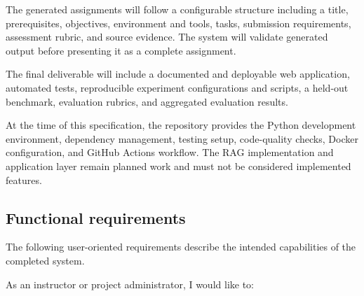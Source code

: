 \documentclass[12pt,a4paper]{article}
\begin{document}
The generated assignments will follow a configurable structure
including a title, prerequisites, objectives, environment and
tools, tasks, submission requirements, assessment rubric, and
source evidence. The system will validate generated output before
presenting it as a complete assignment.

The final deliverable will include a documented and deployable
web application, automated tests, reproducible experiment
configurations and scripts, a held-out benchmark, evaluation
rubrics, and aggregated evaluation results.

At the time of this specification, the repository provides the
Python development environment, dependency management,
testing setup, code-quality checks, Docker configuration, and
GitHub Actions workflow. The RAG implementation and application
layer remain planned work and must not be considered implemented
features.

\subsection{Functional requirements}
\label{sec:functional-requirements}

The following user-oriented requirements describe the intended
capabilities of the completed system.

As an instructor or project administrator, I would like to:
\end{document}

